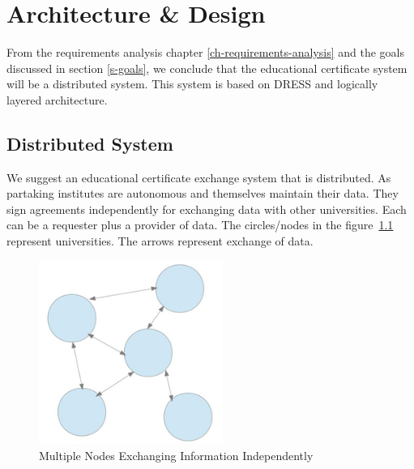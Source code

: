 \documentclass[12pt,a4paper,oneside]{book}
\begin{document}
\chapter{Architecture \& Design}\label{ch-architecture-design}
From the requirements analysis chapter \ref{ch-requirements-analysis} and the goals discussed in section \ref{s-goals}, we conclude that the educational certificate system will be a distributed system. This system is based on DRESS and logically layered architecture.



	


\section{Distributed System}
We suggest an educational certificate exchange system that is distributed. As partaking institutes are autonomous and themselves maintain their data. They sign agreements independently for exchanging data with other universities. Each can be a requester plus a provider of data. The circles/nodes in the figure~\ref{fig:architecture_distributed_independent_exchange} represent universities. The arrows represent exchange of data. \\

\begin{figure}[!htp]
  \centering
  \includegraphics[width=6cm]{architecture_distributed_independent_exchange.png}
  \caption{Multiple Nodes Exchanging Information Independently \cite{The Mobility Project}}
  \label{fig:architecture_distributed_independent_exchange}
\end{figure}
\end{document}
